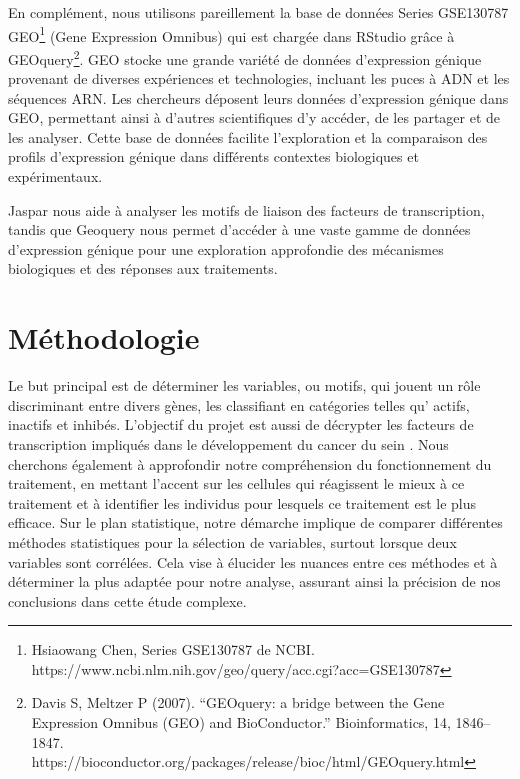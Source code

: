 \documentclass[mstat,12pt]{unswthesis}
\begin{document}
\bigskip

En complément, nous utilisons pareillement la base de données Series
GSE130787
GEO\footnote{ Hsiaowang Chen, Series GSE130787 de NCBI. \newline https://www.ncbi.nlm.nih.gov/geo/query/acc.cgi?acc=GSE130787}
(Gene Expression Omnibus) qui est chargée dans RStudio grâce à
GEOquery\footnote{ Davis S, Meltzer P (2007). “GEOquery: a bridge between the Gene Expression Omnibus (GEO) and BioConductor.” Bioinformatics, 14, 1846–1847. https://bioconductor.org/packages/release/bioc/html/GEOquery.html}.
GEO stocke une grande variété de données d'expression génique provenant
de diverses expériences et technologies, incluant les puces à ADN et les
séquences ARN. Les chercheurs déposent leurs données d'expression
génique dans GEO, permettant ainsi à d'autres scientifiques d'y accéder,
de les partager et de les analyser. Cette base de données facilite
l'exploration et la comparaison des profils d'expression génique dans
différents contextes biologiques et expérimentaux.

\bigskip

Jaspar nous aide à analyser les motifs de liaison des facteurs de
transcription, tandis que Geoquery nous permet d'accéder à une vaste
gamme de données d'expression génique pour une exploration approfondie
des mécanismes biologiques et des réponses aux traitements.

\hypertarget{muxe9thodologie}{%
\chapter{Méthodologie}\label{muxe9thodologie}}

Le but principal est de déterminer les variables, ou motifs, qui jouent
un rôle discriminant entre divers gènes, les classifiant en catégories
telles qu' actifs, inactifs et inhibés. L'objectif du projet est aussi
de décrypter les facteurs de transcription impliqués dans le
développement du cancer du sein . Nous cherchons également à approfondir
notre compréhension du fonctionnement du traitement, en mettant l'accent
sur les cellules qui réagissent le mieux à ce traitement et à identifier
les individus pour lesquels ce traitement est le plus efficace. Sur le
plan statistique, notre démarche implique de comparer différentes
méthodes statistiques pour la sélection de variables, surtout lorsque
deux variables sont corrélées. Cela vise à élucider les nuances entre
ces méthodes et à déterminer la plus adaptée pour notre analyse,
assurant ainsi la précision de nos conclusions dans cette étude
complexe.
\end{document}
